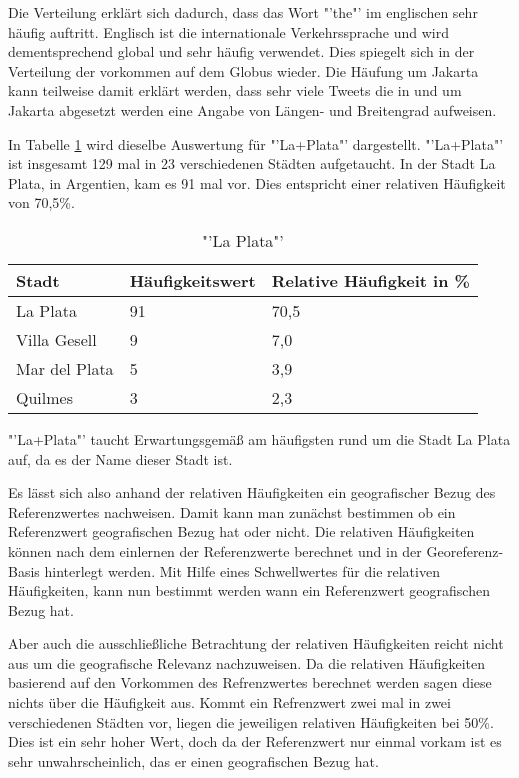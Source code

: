 				Die Verteilung erklärt sich dadurch, dass das Wort "'the"' im englischen sehr häufig auftritt.
				Englisch ist die internationale Verkehrssprache und wird dementsprechend global und sehr häufig verwendet.
				Dies spiegelt sich in der Verteilung der vorkommen auf dem Globus wieder.
				Die Häufung um Jakarta kann teilweise damit erklärt werden, dass sehr viele Tweets die in und um Jakarta abgesetzt werden eine Angabe von Längen- und Breitengrad aufweisen. 

				In Tabelle \ref{tab:laPlata} wird dieselbe Auswertung für "'La+Plata"' dargestellt. 
				"'La+Plata"' ist insgesamt 129 mal in 23 verschiedenen Städten aufgetaucht. 
				In der Stadt La Plata, in Argentien, kam es 91 mal vor.
				Dies entspricht einer relativen Häufigkeit von 70,5\%.

				\begin{table}[h]
				\centering
				\caption{"'La Plata"'}
				\label{tab:laPlata}
				\begin{tabular}{|l|l|l|}
				\hline
				Stadt            & Häufigkeitswert & Relative Häufigkeit in \% \\ \hline \hline
				La Plata         & 91              & 70,5                      \\ \hline
				Villa Gesell     & 9               & 7,0                       \\ \hline
				Mar del Plata    & 5               & 3,9                       \\ \hline
				Quilmes          & 3               & 2,3                       \\ \hline
				\end{tabular}
				\end{table}

				"'La+Plata"' taucht Erwartungsgemäß am häufigsten rund um die Stadt La Plata auf, da es der Name dieser Stadt ist.  

				Es lässt sich also anhand der relativen Häufigkeiten ein geografischer Bezug des Referenzwertes nachweisen.
				Damit kann man zunächst bestimmen ob ein Referenzwert geografischen Bezug hat oder nicht.
				Die relativen Häufigkeiten können nach dem einlernen der Referenzwerte berechnet und in der Georeferenz-Basis hinterlegt werden.
				Mit Hilfe eines Schwellwertes für die relativen Häufigkeiten, kann nun bestimmt werden wann ein Referenzwert geografischen Bezug hat.

				Aber auch die ausschließliche Betrachtung der relativen Häufigkeiten reicht nicht aus um die geografische Relevanz nachzuweisen.
				Da die relativen Häufigkeiten basierend auf den Vorkommen des Refrenzwertes berechnet werden sagen diese nichts über die Häufigkeit aus. 
				Kommt ein Refrenzwert zwei mal in zwei verschiedenen Städten vor, liegen die jeweiligen relativen Häufigkeiten bei 50\%.
				Dies ist ein sehr hoher Wert, doch da der Referenzwert nur einmal vorkam ist es sehr unwahrscheinlich, das er einen geografischen Bezug hat.   

